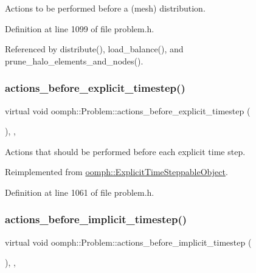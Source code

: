 Actions to be performed before a (mesh) distribution. 



Definition at line 1099 of file problem.\+h.



Referenced by distribute(), load\+\_\+balance(), and prune\+\_\+halo\+\_\+elements\+\_\+and\+\_\+nodes().

\mbox{\label{classoomph_1_1Problem_a6ae06bc0ecba349ebdf76220c1a17546}} 
\subsubsection{\texorpdfstring{actions\+\_\+before\+\_\+explicit\+\_\+timestep()}{actions\_before\_explicit\_timestep()}}
{\footnotesize\ttfamily virtual void oomph\+::\+Problem\+::actions\+\_\+before\+\_\+explicit\+\_\+timestep (\begin{DoxyParamCaption}{ }\end{DoxyParamCaption})\hspace{0.3cm}{\ttfamily [inline]}, {\ttfamily [protected]}, {\ttfamily [virtual]}}



Actions that should be performed before each explicit time step. 



Reimplemented from \hyperlink{classoomph_1_1ExplicitTimeSteppableObject_ae169b713aa971921bfd1269de898b934}{oomph\+::\+Explicit\+Time\+Steppable\+Object}.



Definition at line 1061 of file problem.\+h.

\mbox{\label{classoomph_1_1Problem_a4f19896906d2c0274ad6798cd3ac38dc}} 
\subsubsection{\texorpdfstring{actions\+\_\+before\+\_\+implicit\+\_\+timestep()}{actions\_before\_implicit\_timestep()}}
{\footnotesize\ttfamily virtual void oomph\+::\+Problem\+::actions\+\_\+before\+\_\+implicit\+\_\+timestep (\begin{DoxyParamCaption}{ }\end{DoxyParamCaption})\hspace{0.3cm}{\ttfamily [inline]}, {\ttfamily [protected]}, {\ttfamily [virtual]}}



